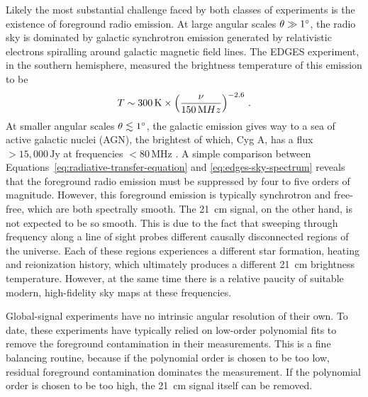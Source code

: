\begin{bibunit}
Likely the most substantial challenge faced by both classes of experiments is the existence of
foreground radio emission. At large angular scales $\theta \gg 1\arcdeg$, the radio sky is dominated
by galactic synchrotron emission generated by relativistic electrons spiralling around galactic
magnetic field lines. The EDGES experiment, in the southern hemisphere, measured the brightness
temperature of this emission to be \citep{2017MNRAS.464.4995M}
\begin{equation}\label{eq:edges-sky-spectrum}
    T \sim 300\,{\rm K} \times \left(\frac{\nu}{150\,{\rm MHz}}\right)^{-2.6}\,.
\end{equation}
At smaller angular scales $\theta \lesssim 1\arcdeg$, the galactic emission gives way to a sea of
active galactic nuclei (AGN), the brightest of which, Cyg A, has a flux $>15,000\,\text{Jy}$ at
frequencies $<80\,\text{MHz}$ \citep{1977A&A....61...99B}. A simple comparison between
Equations~\ref{eq:radiative-transfer-equation} and \ref{eq:edges-sky-spectrum} reveals that the
foreground radio emission must be suppressed by four to five orders of magnitude.  However, this
foreground emission is typically synchrotron and free-free, which are both spectrally smooth. The
21~cm signal, on the other hand, is not expected to be so smooth. This is due to the fact that
sweeping through frequency along a line of sight probes different causally disconnected regions of
the universe. Each of these regions experiences a different star formation, heating and reionization
history, which ultimately produces a different 21~cm brightness temperature.  However, at the same
time there is a relative paucity of suitable modern, high-fidelity sky maps at these frequencies.

Global-signal experiments have no intrinsic angular resolution of their own. To date, these
experiments have typically relied on low-order polynomial fits to remove the foreground
contamination in their measurements. This is a fine balancing routine, because if the polynomial
order is chosen to be too low, residual foreground contamination dominates the measurement. If the
polynomial order is chosen to be too high, the 21~cm signal itself can be removed.


\end{bibunit}
